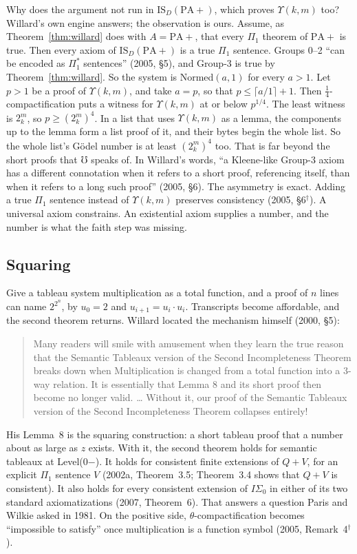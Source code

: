 \documentclass[11pt]{article}
\newcommand{\Mho}{\mho}                     %
\newcommand{\sk}{\ensuremath{^\dagger}}    %
\theoremstyle{plain}
\theoremstyle{definition}
\begin{document}
Why does the argument not run in $\mathrm{IS}_D(\mathrm{PA}{+})$, which
proves $\Upsilon(k,m)$ too? Willard's own engine answers; the observation is
ours. Assume, as Theorem~\ref{thm:willard} does with $A = \mathrm{PA}{+}$,
that every $\Pi_1$ theorem of $\mathrm{PA}{+}$ is true. Then every axiom of
$\mathrm{IS}_D(\mathrm{PA}{+})$ is a true $\Pi_1$ sentence. Groups 0--2 ``can
be encoded as $\Pi_1^*$ sentences'' (2005, \S5), and Group-3 is true by
Theorem~\ref{thm:willard}. So the system is Normed$(a, 1)$ for every
$a > 1$. Let $p > 1$ be a proof of $\Upsilon(k,m)$, and take $a = p$, so
that $p \le \lceil a/1 \rceil + 1$. Then $\tfrac14$-compactification puts a
witness for $\Upsilon(k,m)$ at or below $p^{1/4}$. The least witness is
$2^m_k$, so $p \ge (2^m_k)^4$. In a list that uses $\Upsilon(k,m)$ as a
lemma, the components up to the lemma form a list proof of it, and their
bytes begin the whole list. So the whole list's Gödel number is at least
$(2^m_k)^4$ too. That is far beyond the short proofs that $\Mho$ speaks of.
In Willard's words, ``a
Kleene-like Group-3 axiom has a different connotation when it refers to a
short proof, referencing itself, than when it refers to a long such proof''
(2005, \S6). The asymmetry is exact. Adding a true $\Pi_1$ sentence instead
of $\Upsilon(k,m)$ preserves consistency (2005, \S6\sk). A universal axiom
constrains. An existential axiom supplies a number, and the number is what
the faith step was missing.

\subsection*{Squaring}

Give a tableau system multiplication as a total function, and a proof of $n$
lines can name $2^{2^n}$, by $u_0 = 2$ and $u_{i+1} = u_i \cdot u_i$.
Transcripts become affordable, and the second theorem returns. Willard
located the mechanism himself (2000, \S5):
\begin{quote}\small
Many readers will smile with amusement when they learn the true reason that
the Semantic Tableaux version of the Second Incompleteness Theorem breaks
down when Multiplication is changed from a total function into a 3-way
relation. It is essentially that Lemma 8 and its short proof then become no
longer valid. \ldots{} Without it, our proof of the Semantic Tableaux version
of the Second Incompleteness Theorem collapses entirely!
\end{quote}
His Lemma~8 is the squaring construction: a short tableau proof that a
number about as large as $z$ exists. With it, the second theorem holds for
semantic tableaux at Level(0$-$). It holds for consistent finite extensions
of $Q + V$, for an explicit $\Pi_1$ sentence $V$ (2002a, Theorem~3.5;
Theorem~3.4 shows that $Q + V$ is consistent). It also holds for every consistent extension of $I\Sigma_0$ in
either of its two standard axiomatizations (2007, Theorem~6). That answers a
question Paris and Wilkie asked in 1981. On the positive side,
$\theta$-compactification becomes ``impossible to satisfy'' once
multiplication is a function symbol (2005, Remark~4\sk).
\end{document}
